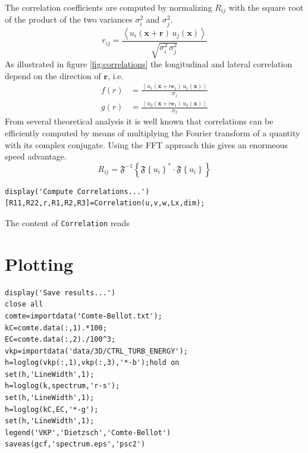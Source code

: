 \documentclass[preprint,12pt,ntfdMod]{elsarticle}
\begin{document}
\begin{par}
\begin{equation}
  \end{equation}
The correlation coefficients are computed by normalizing
$R_{ij}$ with the square root of the product of the two variances
$\sigma_i^2$ and $\sigma_j^2$.
  \begin{equation}
      r_{ij} = \frac{\left<u_i(\mathbf{x}+\mathbf{r})\,u_j(\mathbf{x})\right>}
                  {\sqrt{\sigma_i^2\,\sigma_j^2}}
  \end{equation}
As illustrated in figure \ref{fig:correlations} the longitudinal and lateral
correlation depend on the direction of $\mathbf{r}$, i.e.
  \begin{eqnarray}
      f(r) &= \displaystyle\frac{\left<u_1(\mathbf{x}+r\mathbf{e}_1)\,u_1(\mathbf{x})\right>}
                  {\sigma_1}\\
      g(r) &= \displaystyle\frac{\left<u_2(\mathbf{x}+r\mathbf{e}_1)\,u_2(\mathbf{x})\right>}
                  {\sigma_2}
  \end{eqnarray}
From several theoretical analysis it is well known that correlations can
be efficiently computed by means of multiplying the Fourier transform of
a quantity with its complex conjugate. Using the FFT approach this gives
an enormeous speed advantage.
  \begin{equation}
      R_{ij} =
      \mathfrak{F}^{-1}\left\{\mathfrak{F}\left\{u_i\right\}^*\cdot\mathfrak{F}\left\{u_i\right\}\right\}
  \end{equation}

\end{par} \vspace{1em}
\begin{lstlisting}
display('Compute Correlations...')
[R11,R22,r,R1,R2,R3]=Correlation(u,v,w,Lx,dim);
\end{lstlisting}
\begin{par}

The content of \verb|Correlation| reads


\end{par} \vspace{1em}
\begin{par}




\end{par} \vspace{1em}


\section{Plotting}

\begin{lstlisting}
display('Save results...')
close all
comte=importdata('Comte-Bellot.txt');
kC=comte.data(:,1).*100;
EC=comte.data(:,2)./100^3;
vkp=importdata('data/3D/CTRL_TURB_ENERGY');
h=loglog(vkp(:,1),vkp(:,3),'*-b');hold on
set(h,'LineWidth',1);
h=loglog(k,spectrum,'r-s');
set(h,'LineWidth',1);
h=loglog(kC,EC,'*-g');
set(h,'LineWidth',1);
legend('VKP','Dietzsch','Comte-Bellot')
saveas(gcf,'spectrum.eps','psc2')
\end{lstlisting}
\end{document}

